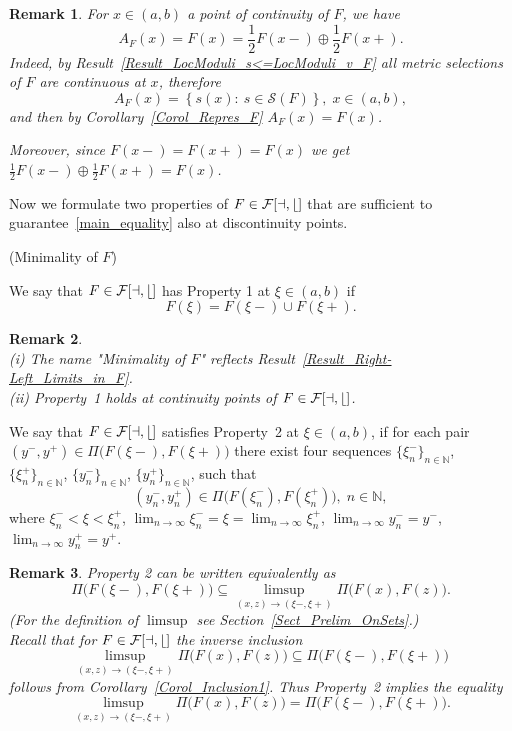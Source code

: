 \documentclass[final,3p,mathptmx]{article}%
\newcommand{\N}{{\mathbb N}}
\newcommand{\Pair}[2]{\Pi \big ( {#1},{#2} \big )}
\newcommand{\calF}{\cal{F}[a,b]}
\newcommand{\setMS}{\mathcal{S}(F)}
\newtheorem{remark}{Remark}[section]
\begin{document}
{{{{	\begin{remark}\label{Remark_LimitSet=F}
		For $x\in(a,b)$ a point of continuity of $F$, we have
		$$ 
		A_F(x) = F(x)= \frac{1}{2} F(x-)\oplus \frac{1}{2} F(x+).
		$$
		Indeed, by Result~\ref{Result_LocModuli_s<=LocModuli_v_F} all metric selections of $F$ are continuous at $x$, 
		therefore 
		$$
		A_{F}(x) = \left \{ s(x) : \ s \in \setMS \right \} , \; x \in (a,b),
		$$
		and then by Corollary~\ref{Corol_Repres_F} $A_{F}(x) = F(x)$. 
	
		Moreover, since  $F(x-)=F(x+)=F(x)$ we get  $\frac{1}{2} F(x-)\oplus \frac{1}{2} F(x+)=F(x)$.
	\end{remark}

	
Now we formulate two properties of $F\in \calF$ that are sufficient to guarantee~\eqref{main_equality} also at discontinuity points.

(Minimality of $F$)\label{prop1}

We say that $F\in \calF$ has Property 1 at $\xi \in (a,b)$ if 
$$
	F(\xi) = F(\xi-)\cup F(\xi+).
$$

\begin{remark}\label{Remark_Prop1} ${}$\\
(i) The name "Minimality of $F$" reflects Result~\ref{Result_Right-Left_Limits_in_F}.\\
(ii)  Property~1 holds at continuity points of $F\in \calF$.
\end{remark}


We say that $F \in \calF$ satisfies Property~2 at $\xi \in (a,b)$, if for each pair $(y^-, y^+) \in \Pair{F(\xi-)}{F(\xi+)}$ there exist four sequences 
$\{\xi_n^-\}_{n \in \N}$, $\{\xi_n^+\}_{n \in \N}$, $\{y_n^-\}_{n \in \N} $, $\{y_n^+\}_{n \in \N}$, such that 
$$
(y_n^-, y_n^+) \in \Pair{F(\xi_n^-)}{F(\xi_n^+)} , \; n \in \N,
$$
where $\xi_n^- < \xi < \xi_n^+$,
$\lim_{n \to \infty} \xi_n^- = \xi = \lim_{n \to \infty} \xi_n^+$,
$\lim_{n \to \infty} y_n^- = y^-$,  $\lim_{n \to \infty} y_n^+ = y^+$.



\begin{remark}\label{Remark_Prop2} Property 2 can be written equivalently as
$$
\Pair{F(\xi-)}{F(\xi+)} \subseteq \limsup_{(x,z) \to (\xi-, \xi+)} \Pair{F(x)}{F(z)} .
$$
\noindent (For the definition of $ \limsup$ see Section~\ref{Sect_Prelim_OnSets}.)\\
Recall that for  $F \in \calF$ the inverse inclusion
$$
\limsup_{(x,z) \to (\xi-, \xi+)} \Pair{F(x)}{F(z)} \subseteq \Pair{F(\xi-)}{F(\xi+)}
$$
follows from Corollary~\ref{Corol_Inclusion1}. Thus Property~2 implies the equality
$$%
	\limsup_{(x,z) \to (\xi-, \xi+)} \Pair{F(x)}{F(z)} = \Pair{F(\xi-)}{F(\xi+)}.
$$%
\end{remark}

}}}}
\end{document}
